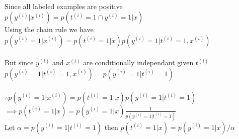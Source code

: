 \begin{answer}\\
Since all labeled examples are positive\\
$p(y^{(i)}|x^{(i)})=p(t^{(i)}=1 \cap y^{(i)}=1|x)$\\
Using the chain rule we have\\
$p(y^{(i)}=1|x^{(i)})=p(t^{(i)}=1|x)p(y^{(i)}=1|t^{(i)}=1,x^{(i)})$\\\\
But since $y^{(i)}$ and $x^{(i)}$ are conditionally independant given $t^{(i)}$\\
$p(y^{(i)}=1|t^{(i)}=1,x^{(i)})=p(y^{(i)}=1|t^{(i)}=1)$\\\\
$\therefore p(y^{(i)}=1|x^{(i)})=p(t^{(i)}=1|x)p(y^{(i)}=1|t^{(i)}=1)$\\
$\implies p(t^{(i)}=1|x)=p(y^{(i)}=1|x) \frac{1}{p(y^{(i)}=1|t^{(i)}=1)}$\\
Let $\alpha=p(y^{(i)}=1|t^{(i)}=1)$ then $p(t^{(i)}=1|x)=p(y^{(i)}=1|x)/\alpha$
\end{answer}
